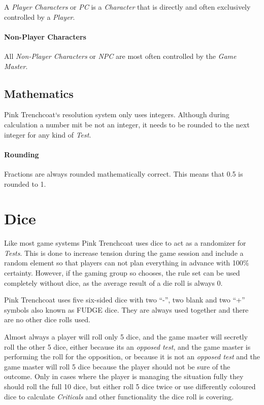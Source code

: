 A \emph{Player Characters} or \emph{PC} is a \emph{Character} that is directly and often
exclusively controlled by a \emph{Player}.

\paragraph{Non-Player Characters}

All \emph{Non-Player Characters} or \emph{NPC} are most often controlled by the \emph{Game Master}.

\subsection{Mathematics}

Pink Trenchcoat`s resolution system only uses integers. Although during calculation
a number mit be not an integer, it needs to be rounded to the next integer for any
kind of \emph{Test}.

\paragraph{Rounding}

Fractions are always rounded mathematically correct. This means that 0.5 is
rounded to 1.

\section{Dice}

Like most game systems Pink Trenchcoat uses dice to act as a randomizer for
\emph{Tests}. This is done to increase tension during the game session and include
a random element so that players can not plan everything in advance with 100\%
certainty. However, if the gaming group so chooses, the rule set can be used
completely without dice, as the average result of a die roll is always 0.

Pink Trenchcoat uses five six-sided dice with two “-”, two blank and two “+”
symbols also known as FUDGE dice. They are always used together and there are no
other dice rolls used.


Almost always a player will roll only 5 dice,
and the game master will secretly roll the other 5 dice, either because its
an \emph{opposed test}, and the game master is performing the roll for the
opposition, or because it is not an \emph{opposed test} and the game master will
roll 5 dice because the player should not be sure of the outcome. Only in cases where
the player is managing the situation fully they should roll the full 10 dice, but
either roll 5 dice twice or use differently coloured dice to calculate
\emph{Criticals} and other functionality the dice roll is covering.


